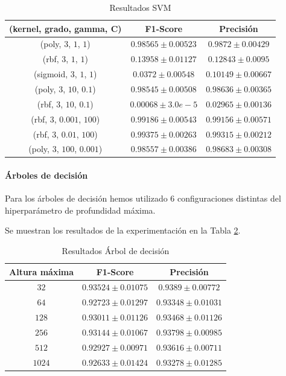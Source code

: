 \documentclass[12pt]{article}
\begin{document}
\newpage
\begin{table}[!ht]
	\caption{Resultados SVM}
	\centering
		 \begin{tabular}{||c c c||}
			\hline 
			(kernel, grado, gamma, C) & F1-Score & Precisión \\ [0.5ex]  
			\hline\hline
			(poly, $3$, $1$, $1$) & $0.98565 \pm 0.00523$ & $0.9872 \pm 0.00429$ \\
			\hline 
			(rbf, $3$, $1$, $1$) & $0.13958 \pm 0.01127$ & $0.12843 \pm 0.0095$ \\
			\hline 
			(sigmoid, $3$, $1$, $1$) & $0.0372 \pm 0.00548$ & $0.10149 \pm 0.00667$ \\
			\hline 
			(poly, $3$, $10$, $0.1$) & $0.98545 \pm 0.00508$ & $0.98636 \pm 0.00365$ \\
			\hline 
			(rbf, $3$, $10$, $0.1$) & $0.00068 \pm 3.0e-5$ & $0.02965 \pm 0.00136$ \\
			\hline 
			(rbf, $3$, $0.001$, $100$) & $0.99186 \pm 0.00543$ & $0.99156 \pm 0.00571$ \\
			\hline 
			(rbf, $3$, $0.01$, $100$) & $0.99375 \pm 0.00263$ & $0.99315 \pm 0.00212$ \\
			\hline 
			(poly, $3$, $100$, $0.001$) & $0.98557 \pm 0.00386$ & $0.98683 \pm 0.00308$ \\
			\hline 
		 \end{tabular}
	\label{Tab:SVM_5}
	\end{table}

\paragraph{Árboles de decisión}
Para los árboles de decisión hemos utilizado 6 configuraciones distintas del hiperparámetro de profundidad máxima.

Se muestran los resultados de la experimentación en la Tabla \ref{Tab:DecisionTree_5}.

\begin{table}[!ht]
	\caption{Resultados Árbol de decisión}
	\centering
		 \begin{tabular}{||c c c||}
			\hline 
			Altura máxima & F1-Score & Precisión \\ [0.5ex]  
			\hline\hline
			$32$ & $0.93524 \pm 0.01075$ & $0.9389 \pm 0.00772$ \\
			\hline 
			$64$ & $0.92723 \pm 0.01297$ & $0.93348 \pm 0.01031$ \\
			\hline 
			$128$ & $0.93011 \pm 0.01126$ & $0.93468 \pm 0.01126$ \\
			\hline 
			$256$ & $0.93144 \pm 0.01067$ & $0.93798 \pm 0.00985$ \\
			\hline 
			$512$ & $0.92927 \pm 0.00971$ & $0.93616 \pm 0.00711$ \\
			\hline 
			$1024$ & $0.92633 \pm 0.01424$ & $0.93278 \pm 0.01285$ \\
			\hline
		 \end{tabular}
	\label{Tab:DecisionTree_5}
	\end{table}
\end{document}

